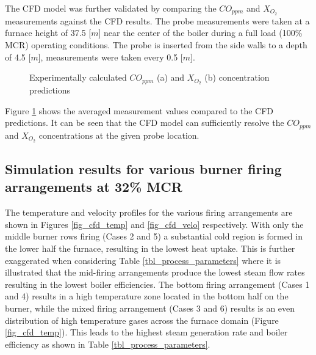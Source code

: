\documentclass[review]{elsarticle}
\begin{document}
The CFD model was further validated by comparing the $CO_{ppm}$ and $X_{O_{2}}$ measurements against the CFD results. The probe measurements were taken at a furnace height of 37.5 [$m$] near the center of the boiler during a full load (100\% MCR) operating conditions. The probe is inserted from the side walls to a depth of 4.5 [$m$], measurements were taken every 0.5 [$m$].\\
\begin{figure}[h!]
\centering
{}
\hspace{5mm}
\caption{Experimentally calculated $CO_{ppm}$ (a) and $X_{O_{2}}$ (b) concentration predictions}
\label{fig_probe_valid}
\end{figure}

Figure \ref{fig_probe_valid} shows the averaged measurement values compared to the CFD predictions. It can be seen that the CFD model can sufficiently resolve the $CO_{ppm}$ and $X_{O_{2}}$ concentrations at the given probe location.
\newpage
\subsection{Simulation results for various burner firing arrangements at 32\% MCR }
The temperature and velocity profiles for the various firing arrangements are shown in Figures \ref{fig_cfd_temp} and \ref{fig_cfd_velo} respectively. With only the middle burner rows firing (Cases 2 and 5) a substantial cold region is formed in the lower half the furnace, resulting in the lowest heat uptake. This is further exaggerated when considering Table \ref{tbl_process_parameters} where it is illustrated that the mid-firing arrangements produce the lowest steam flow rates resulting in the lowest boiler efficiencies. The bottom firing arrangement (Cases 1 and 4) results in a high temperature zone located in the bottom half on the burner, while the mixed firing arrangement (Cases 3 and 6) results is an even distribution of high temperature gases across the furnace domain (Figure \ref{fig_cfd_temp}). This leads to the highest steam generation rate and boiler efficiency as shown in Table \ref{tbl_process_parameters}.
\end{document}
